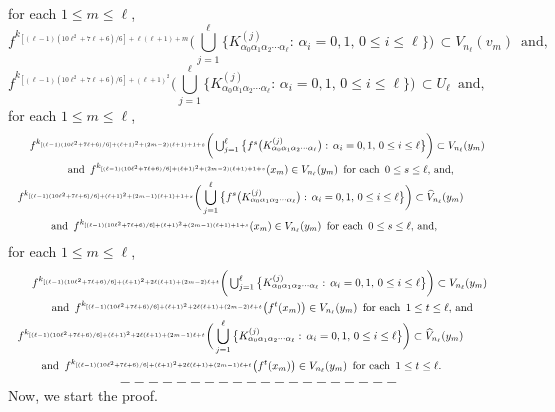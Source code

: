 \documentclass[12pt]{article}
\newcommand{\al}{\alpha}
\begin{document}
for each $1 \le m \le \ell$, 
$$
f^{k_{[(\ell-1)(10\ell^2+7\ell+6)/6]+\ell(\ell+1)+m}}\bigg(\bigcup_{j=1}^\ell \big\{ K_{\al_0\al_1\al_2\cdots\al_\ell}^{(j)}: \, \al_i = 0, 1, \, 0 \le i \le \ell \big\}\bigg) \, \subset V_{n_\ell}(v_m) \,\,\, \text{and},
$$
$$
f^{k_{[(\ell-1)(10\ell^2+7\ell+6)/6]+(\ell+1)^2}}\bigg(\bigcup_{j=1}^\ell \big\{ K_{\al_0\al_1\al_2\cdots\al_\ell}^{(j)}: \, \al_i = 0, 1, \, 0 \le i \le \ell \big\}\bigg) \, \subset U_\ell \,\,\, \text{and}, \qquad\qquad\qquad\qquad
$$
for each $1 \le m \le \ell$, 
\begin{multline*}
$$
f^{k_{[(\ell-1)(10\ell^2+7\ell+6)/6]+(\ell+1)^2+(2m-2)(\ell+1)+1+s}}\bigg(\bigcup_{j=1}^\ell \big\{ f^s\big(K_{\al_0\al_1\al_2\cdots\al_\ell}^{(j)}\big): \, \al_i = 0, 1, \, 0 \le i \le \ell \big\}\bigg) \subset V_{n_\ell}(y_m) \,\,\, \\ 
\, \text{and} \,\,\, f^{k_{[(\ell-1)(10\ell^2+7\ell+6)/6]+(\ell+1)^2+(2m-2)(\ell+1)+1+s}}(x_m) \in V_{n_\ell}(y_m) \,\,\, \text{for each} \,\,\, 0 \le s \le \ell, \, \text{and,} \\
\,\,\,\,\, f^{k_{[(\ell-1)(10\ell^2+7\ell+6)/6]+(\ell+1)^2+(2m-1)(\ell+1)+1+s}}\bigg(\bigcup_{j=1}^\ell \big\{ f^s\big(K_{\al_0\al_1\al_2\cdots\al_\ell}^{(j)}\big): \, \al_i = 0, 1, \, 0 \le i \le \ell \big\}\bigg) \subset \widehat V_{n_\ell}(y_m) \,\,\, \qquad\quad\quad \\ 
\text{and} \,\,\, f^{k_{[(\ell-1)(10\ell^2+7\ell+6)/6]+(\ell+1)^2+(2m-1)(\ell+1)+1+s}}(x_m) \in V_{n_\ell}(y_m) \,\,\, \text{for each} \,\,\, 0 \le s \le \ell, \, \text{and,} \quad\quad\quad
$$
\end{multline*}
for each $1 \le m \le \ell$, 
\begin{multline*}
$$
f^{k_{[(\ell-1)(10\ell^2+7\ell+6)/6]+(\ell+1)^2+2\ell(\ell+1)+(2m-2)\ell+t}}\bigg(\bigcup_{j=1}^\ell \big\{ K_{\al_0\al_1\al_2\cdots\al_\ell}^{(j)}: \, \al_i = 0, 1, \, 0 \le i \le \ell \big\}\bigg) \subset V_{n_\ell}(y_m) \\ 
\, \,\,\, \text{and} \,\,\, f^{k_{[(\ell-1)(10\ell^2+7\ell+6)/6]+(\ell+1)^2+2\ell(\ell+1)+(2m-2)\ell+t}}\big(f^{t}(x_m)\big) \in V_{n_\ell}(y_m) \,\,\, \text{for each} \,\,\, 1 \le t \le \ell, \, \text{and} \, \\
\,\,\,\,\, f^{k_{[(\ell-1)(10\ell^2+7\ell+6)/6]+(\ell+1)^2+2\ell(\ell+1)+(2m-1)\ell+t}}\bigg(\bigcup_{j=1}^\ell \big\{ K_{\al_0\al_1\al_2\cdots\al_\ell}^{(j)}: \, \al_i = 0, 1, \, 0 \le i \le \ell \big\}\bigg) \subset \widehat V_{n_\ell}(y_m) \quad\quad\qquad\,\, \\ 
\,\,\, \text{and} \,\,\, f^{k_{[(\ell-1)(10\ell^2+7\ell+6)/6]+(\ell+1)^2+2\ell(\ell+1)+(2m-1)\ell+t}}\big(f^{t}(x_m)\big) \in V_{n_\ell}(y_m) \,\,\, \text{for each} \,\,\, 1 \le t \le \ell. \quad\quad\quad\,\,\,\,\,
\end{multline*}
$$--------------------$$
\indent Now, we start the proof. 
\end{document}
